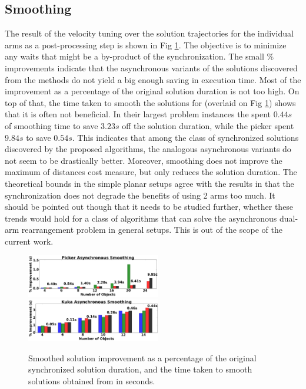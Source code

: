 \subsection{Smoothing}
The result of the velocity tuning over the solution trajectories for the individual arms as a post-processing step is shown in Fig \ref{fig:smoothing}. The objective is to minimize any waits that might be a by-product of the synchronization. 
The small \% improvements indicate that the asynchronous variants of the solutions discovered from the methods do not yield a big enough saving in execution time. 
Most of the improvement as a percentage of the original solution duration is not too high. On top of that, the time taken to smooth the solutions for \algo (overlaid on Fig \ref{fig:smoothing}) shows that it is often not beneficial.
In their largest problem instances the \kuka spent $ 0.44s $ of smoothing time to save $ 3.23s $ off the solution duration, while the picker spent $  9.84s $ to save $ 0.54s $.
This indicates that among the class of synchronized solutions discovered by the proposed algorithms, the analogous asynchronous variants do not seem to be drastically better. Moreover, smoothing does not improve the maximum of distances cost measure, but only reduces the solution duration. The theoretical bounds in the simple planar setups agree with the results in that the synchronization does not degrade the benefits of using 2 arms too much. It should be pointed out though that it needs to be studied further, whether these trends would hold for a class of algorithms that can solve the asynchronous dual-arm rearrangement problem in general setups. This is out of the scope of the current work.
 


\begin{figure}
	\centering
	\includegraphics[width=2.3in]{figures/results/sp_smoothing}
	\includegraphics[width=2.3in]{figures/results/kuka_smoothing}
	\caption{Smoothed solution improvement as a percentage of the original synchronized solution duration, and the time taken to smooth solutions obtained from \algo in seconds.}
	\label{fig:smoothing}
\end{figure}





